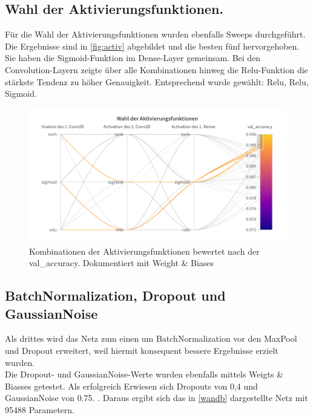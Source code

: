 \documentclass[
fontsize=12pt,					%
paper=a4,						%
twoside=true, 					%
listof=totoc, 					%
bibliography=totoc,				%
titlepage, 						%
headsepline, 					%
DIV=12,							%
BCOR=6mm,						%
cleardoublepage=empty,			%
parskip,							%
ngerman
]{scrartcl}
\begin{document}
\subsection{Wahl der Aktivierungsfunktionen.}

Für die Wahl der Aktivierungsfunktionen wurden ebenfalls Sweeps durchgeführt. Die Ergebnisse sind in \autoref{fig:activ} abgebildet und die besten fünf hervorgehoben. Sie haben die Sigmoid-Funktion im Dense-Layer gemeinsam. Bei den Convolution-Layern zeigte über alle Kombinationen hinweg die Relu-Funktion die stärkste Tendenz zu höher Genauigkeit. Entsprechend wurde gewählt: Relu, Relu, Sigmoid.

\begin{figure}[h]
	\centering
	\includegraphics[width=0.7\linewidth]{images/Activ}
	\caption{Kombinationen der Aktivierungsfunktionen bewertet nach der val\_accuracy. Dokumentiert mit Weight \& Biases}
	\label{fig:activ}
\end{figure}

\subsection{BatchNormalization, Dropout und GaussianNoise}

Als drittes wird das Netz zum einen um BatchNormalization vor den MaxPool und Dropout erweitert, weil hiermit konsequent bessere Ergebnisse erzielt wurden.\\
Die Dropout- und GaussianNoise-Werte wurden ebenfalls mittels Weigts \& Biasses getestet. Als erfolgreich Erwiesen sich Dropouts von 0,4 und GaussianNoise von 0.75. \textcolor{{red}{papers (dropout gege noverfitting)}}. Daraus ergibt sich das in \autoref{wandb} dargestellte Netz mit 95488 Parametern.
\end{document}
